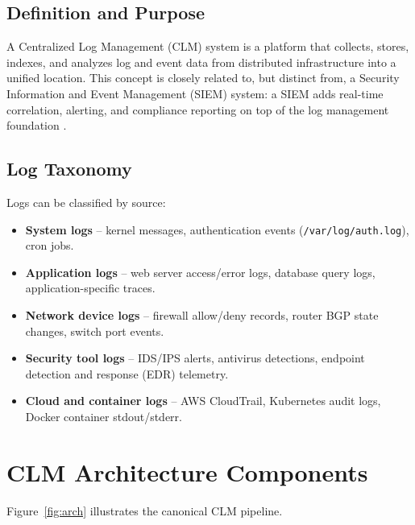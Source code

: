 \documentclass[12pt,a4paper]{report}
\begin{document}
\subsection{Definition and Purpose}

A Centralized Log Management (CLM) system is a platform that collects, stores, indexes,
and analyzes log and event data from distributed infrastructure into a unified location.
This concept is closely related to, but distinct from, a Security Information and Event
Management (SIEM) system: a SIEM adds real-time correlation, alerting, and compliance
reporting on top of the log management foundation \cite{stallings2023}.

\subsection{Log Taxonomy}

Logs can be classified by source:

\begin{itemize}[leftmargin=1.5em]
    \item \textbf{System logs} -- kernel messages, authentication events (\texttt{/var/log/auth.log}),
          cron jobs.
    \item \textbf{Application logs} -- web server access/error logs, database query logs,
          application-specific traces.
    \item \textbf{Network device logs} -- firewall allow/deny records, router BGP state changes,
          switch port events.
    \item \textbf{Security tool logs} -- IDS/IPS alerts, antivirus detections, endpoint
          detection and response (EDR) telemetry.
    \item \textbf{Cloud and container logs} -- AWS CloudTrail, Kubernetes audit logs,
          Docker container stdout/stderr.
\end{itemize}

\section{CLM Architecture Components}

Figure~\ref{fig:arch} illustrates the canonical CLM pipeline.
\end{document}
